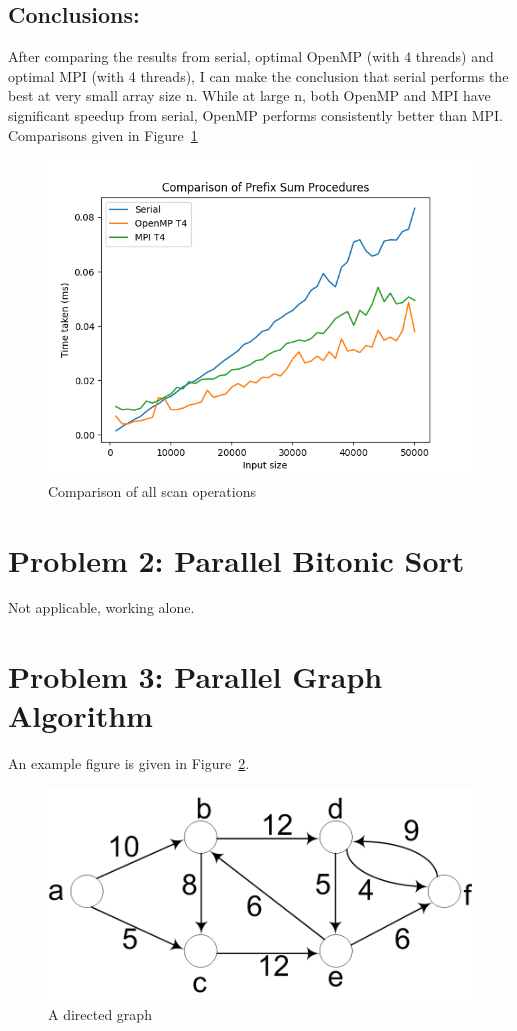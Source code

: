 	\subsection{Conclusions:}
	After comparing the results from serial, optimal OpenMP (with 4 threads) and optimal MPI (with 4 threads), I can make the conclusion that serial performs the best at very small array size n. While at large n, both OpenMP and MPI have significant speedup from serial, OpenMP performs consistently better than MPI.
	Comparisons given in Figure~\ref{fig:fig_scan_comparison}
	\begin{figure}[!htb]
		\centering
		\includegraphics[width=0.6\linewidth]{scan_comparison.png}
		\caption{Comparison of all scan operations}
		\label{fig:fig_scan_comparison}
	\end{figure}

	\section{Problem 2: Parallel Bitonic Sort}
	Not applicable, working alone.
	
	\section{Problem 3: Parallel Graph Algorithm}
	An example figure is given in Figure~\ref{fig:sp_fig1}.
	\begin{figure}[!htb]
		\centering
		\includegraphics[width=0.5\linewidth]{sp_fig1.png}
		\caption{A directed graph}\label{fig:sp_fig1}
	\end{figure}
	
